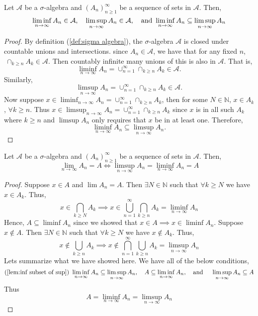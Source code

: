 \documentclass[../main.tex]{subfiles}
\begin{document}
\begin{lemma}\label{lem:inf subset of sup}
Let $\mathcal{A}$ be a $\sigma$-algebra and $(A_n)^\infty_{n\geq 1}$ be a sequence 
of sets in $\mathcal{A}$. Then, \[
\liminf_{n\to\infty}{A_n} \in \mathcal{A}, \quad \limsup_{n\to\infty}{A_n} \in \mathcal{A}, \quad \textnormal{and } \liminf_{n\to\infty}{A_n} \subseteq \limsup_{n\to\infty}{A_n}
\]
\end{lemma}

\begin{proof}
By definition (\ref{def:sigma algebra}), the $\sigma$-algebra $\mathcal{A}$
is closed under countable unions and intersections. since $A_n \in \mathcal{A}$, we have that 
for any fixed $n$, $ \ \cap_{k\geq n}{A_k} \in \mathcal{A}$. Then
countably infinite many unions of this is also in $\mathcal{A}$. That is, \[
\liminf_{n\to\infty}{A_n} = \cup^\infty_{n=1}\cap_{k\geq n}{A_k} \in \mathcal{A}.
\]
Similarly, \[
    \limsup_{n\to\infty}{A_n} = \cup^\infty_{n=1}\cap_{k\geq n}{A_k} \in \mathcal{A}.
\]
Now suppose $x \in \liminf_{n\to\infty}{A_n} = \cup^\infty_{n=1}\cap_{k\geq n}{A_k}$, then for some
$N \in \mathbb{N}$, $x \in A_k$, $\forall k \geq n$. Thus $x \in \limsup_{n\to\infty}{A_n} = \cup^\infty_{n=1}\cap_{k\geq n}{A_k}$ since
$x$ is in all such $A_k$ where $k \geq n$ and $\limsup{A_n}$ only requires that $x$ be in at least one. Therefore,
\[
\liminf_{n\to\infty}{A_n} \subseteq \limsup_{n\to\infty}{A_n}.
\]
\end{proof}




\begin{lemma}\label{lem:sup equal inf mean converge}
Let $\mathcal{A}$ be a $\sigma$-algebra and $(A_n)^\infty_{n\geq 1}$ be a sequence 
of sets in $\mathcal{A}$. Then, \[
\lim_{n\to\infty}{A_n}=A \iff \limsup_{n\to\infty}{A_n} = \liminf_{n\to\infty}{A_n} = A
\]
\end{lemma}

\begin{proof}
Suppose $ x \in A$ and $\lim{A_n} = A$. Then $\exists N \in \mathbb{N}$ such that
$\forall k \geq N$ we have $x \in A_k$. Thus, \[
x \in \bigcap_{k\geq N}{A_k} \implies x \in \bigcup^\infty_{n=1}\bigcap_{k\geq n}{A_k} = \liminf_{n\to\infty}{A_n}
\]
Hence, $A \subseteq \liminf{A_n}$ since we showed that $x\in A \implies x \in \liminf{A_n}$.
Suppose $x \notin A$. Then $\exists N \in \mathbb{N}$ such that $\forall k \geq N$ we have
$x \notin A_k$. Thus, \[
x \notin \bigcup_{k\geq n}{A_k} \implies x \notin \bigcap^\infty_{n=1}\bigcup_{k\geq n}{A_k} = \limsup_{n\to \infty}{A_n}
\]
Lets summarize what we have showed here. We have all of the below conditions, 
\[
(\ref{lem:inf subset of sup}) \ \liminf_{n\to\infty}{A_n} \subseteq \limsup_{n\to\infty}{A_n}, \quad A \subseteq \liminf_{n\to\infty}{A_n}, \quad \textnormal{and } \quad \limsup_{n\to\infty}{A_n} \subseteq A
\]
Thus \[
A = \liminf_{n\to\infty}{A_n} = \limsup_{n\to\infty}{A_n}
\]

\end{proof}
\end{document}
